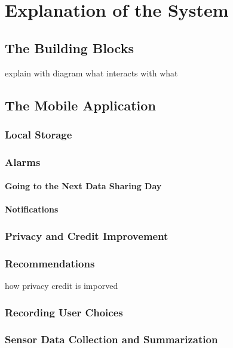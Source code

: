 \chapter{Explanation of the System}

\section{The Building Blocks}

explain with diagram what interacts with what

\section{The Mobile Application}

\subsection{Local Storage}

\subsection{Alarms}
\subsubsection{Going to the Next Data Sharing Day}
\subsubsection{Notifications}

\subsection{Privacy and Credit Improvement}

\subsection{Recommendations}
how privacy credit is imporved

\subsection{Recording User Choices}

\subsection{Sensor Data Collection and Summarization}

